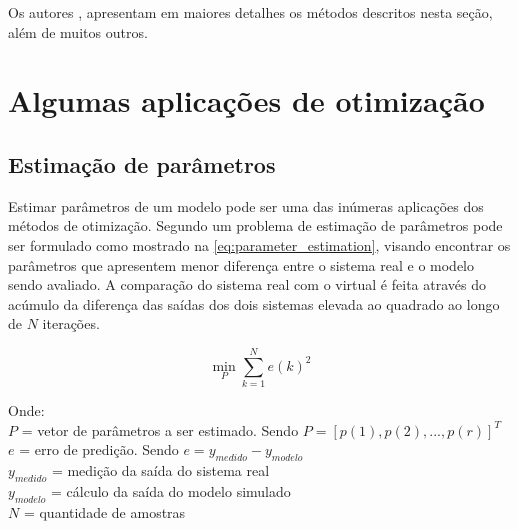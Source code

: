 Os autores ,  apresentam em maiores detalhes
os métodos descritos nesta seção, além de muitos outros.


\section{Algumas aplicações de otimização}
\label{sec:aplicacoes_de_otimizacao}

\subsection{Estimação de parâmetros}
\label{subsec:estimacao_de_parametros}

Estimar parâmetros de um modelo pode ser uma das inúmeras aplicações dos métodos de otimização.
Segundo  um problema de estimação de parâmetros pode ser formulado
como mostrado na \cref{eq:parameter_estimation}, visando encontrar os parâmetros que
apresentem menor diferença entre o sistema real e o modelo sendo avaliado.
A comparação do sistema real com o virtual é feita através do acúmulo da diferença das saídas dos
dois sistemas elevada ao quadrado ao longo de $N$ iterações.

\begin{equation}
	\label{eq:parameter_estimation}
	\min_{P} \sum_{k=1}^{N} e(k)^2
\end{equation}

\noindent
Onde: \\
$P$ = vetor de parâmetros a ser estimado. Sendo $ P = [p(1), p(2), ..., p(r)]^T $ \\
$e$ = erro de predição. Sendo $ e = y_{medido} - y_{modelo} $ \\
$ y_{medido} $ = medição da saída do sistema real \\
$ y_{modelo} $ = cálculo da saída do modelo simulado \\
$ N $ = quantidade de amostras
\newline

